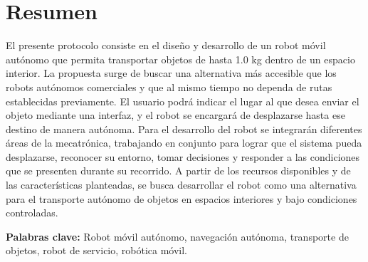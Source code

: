 
\chapter*{Resumen}
\ifProtocolo
\fi

El presente protocolo consiste en el diseño y desarrollo de un robot móvil autónomo que permita transportar objetos de hasta 1.0 kg dentro de un espacio interior. La propuesta surge de buscar una alternativa más accesible que los robots autónomos comerciales y que al mismo tiempo no dependa de rutas establecidas previamente. El usuario podrá indicar el lugar al que desea enviar el objeto mediante una interfaz, y el robot se encargará de desplazarse hasta ese destino de manera autónoma. Para el desarrollo del robot se integrarán diferentes áreas de la mecatrónica, trabajando en conjunto para lograr que el sistema pueda desplazarse, reconocer su entorno, tomar decisiones y responder a las condiciones que se presenten durante su recorrido. A partir de los recursos disponibles y de las características planteadas, se busca desarrollar el robot como una alternativa para el transporte autónomo de objetos en espacios interiores y bajo condiciones controladas.

\vspace{1.5em}
\noindent\textbf{Palabras clave:} Robot móvil autónomo, navegación autónoma, transporte de objetos, robot de servicio, robótica móvil.